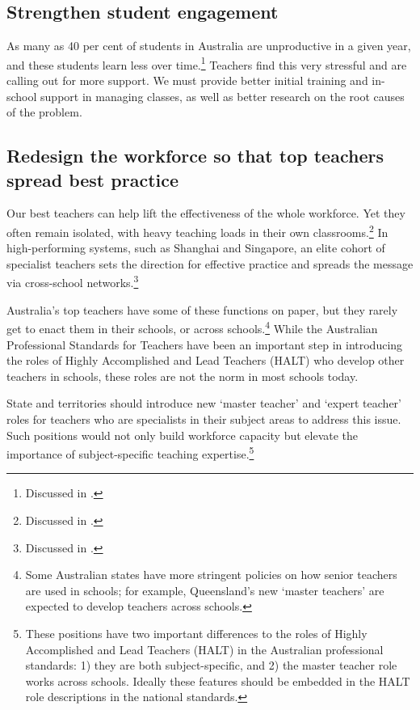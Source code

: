 \subsection{Strengthen student engagement}\label{subsec:engagement}

As many as 40 per cent of students in Australia are unproductive in a given year, and these students learn less over time.\footnote{Discussed in \textcite{Gossetal2017Engagingstudents}.}
Teachers find this very stressful and are calling out for more support. We must provide better initial training and in-school support in managing classes, as well as better research on the root causes of the problem.
\subsection{Redesign the workforce so that top teachers spread best practice}\label{subsec:specialist-teachers}

Our best teachers can help lift the effectiveness of the whole workforce. Yet they often remain isolated, with heavy teaching loads in their own classrooms.\footnote{Discussed in \textcite{Pete-2016-theOz-School-funding-circuit-breaker-with-appeal-to-all}.}
In high-performing systems, such as Shanghai and Singapore, an elite cohort of specialist teachers sets the direction for effective practice and spreads the message via cross-school networks.\footnote{Discussed in \textcite{Jensen2012CatchingUpLearning}.}  

Australia’s top teachers have some of these functions on paper, but they rarely get to enact them in their schools, or across schools.\footnote{Some Australian states have more stringent policies on how senior teachers are used in schools; for example, Queensland's new `master teachers' are expected to develop teachers across schools.} While the Australian Professional Standards for Teachers have been an important step in introducing the roles of Highly Accomplished and Lead Teachers (HALT) who develop other teachers in schools, these roles are not the norm in most schools today.

State and territories should introduce new `master teacher' and `expert teacher' roles for teachers who are specialists in their subject areas to address this issue. Such positions would not only build workforce capacity but elevate the importance of subject-specific teaching expertise.\footnote{These positions have two important differences to the roles of Highly Accomplished and Lead Teachers (HALT) in the Australian professional standards: 1) they are both subject-specific, and 2) the master teacher role works across schools. Ideally these features should be embedded in the HALT role descriptions in the national standards.}

